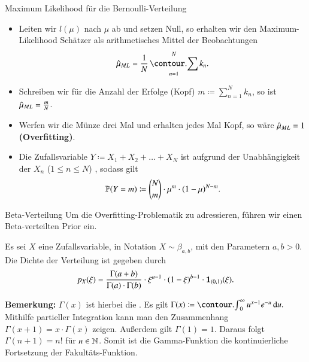 \begin{frame}{Maximum Likelihood für die Bernoulli-Verteilung}{}
	\begin{itemize}
		\item Leiten wir $l(\mu)$ nach $\mu$ ab und setzen Null, so erhalten wir den Maximum-Likelihood Schätzer als
			arithmetisches Mittel der Beobachtungen
		\begin{equation*}
			\muML = \frac{1}{N} \sum_{n=1}^N k_n.
		\end{equation*}
		\item Schreiben wir für die Anzahl der Erfolge (Kopf) $m \coloneqq \sum_{n=1}^N k_n$, so ist $\hat{\mu}_{ML} = \frac{m}{N}$.
		\item Werfen wir die Münze drei Mal und erhalten jedes Mal Kopf, so wäre $\hat{\mu}_{ML} = 1$ \textbf{(Overfitting)}.
		\item Die Zufallsvariable $Y \coloneqq X_1 + X_2 + \ldots + X_N$ ist aufgrund der Unabhängigkeit der $X_n$
			($1 \le n \le N$) , sodass gilt
		\begin{equation*}
			\mathbb{P}(Y = m) \coloneqq {N \choose m} \cdot \mu^m \cdot (1 - \mu)^{N - m}.
		\end{equation*}
	\end{itemize}
\end{frame}


\begin{frame}{Beta-Verteilung}{}
	Um die Overfitting-Problematik zu adressieren, führen wir einen Beta-verteilten Prior ein.
	
	\begin{mydef}
		Es sei $X$ eine  Zufallsvariable, in Notation $X \sim \beta_{a, b}$, mit den Parametern
		$a, b > 0$. Die Dichte der Verteilung ist gegeben durch
		\begin{equation*}
			p_X(\xi)
				= \frac{\Gamma(a + b)}{\Gamma(a) \cdot \Gamma(b)}
					\cdot \xi^{a - 1} \cdot (1 - \xi)^{b - 1} \cdot \bm{1}_{(0, 1)}(\xi).
		\end{equation*}
	\end{mydef}
	
	\begin{boxGray}
		\textbf{Bemerkung:} $\Gamma(x)$ ist hierbei die . Es gilt
		$\Gamma(x) \coloneqq \int_0^\infty u^{x-1} e^{-u}\,\diff u.$ Mithilfe partieller Integration kann man den Zusammenhang
		$\Gamma(x + 1) = x \cdot \Gamma(x)$ zeigen. Außerdem gilt $\Gamma(1) = 1$. Daraus folgt $\Gamma(n + 1) = n!$ für
		$n \in \mathbb{N}$. Somit ist die Gamma-Funktion die kontinuierliche Fortsetzung der Fakultäts-Funktion.
	\end{boxGray}
\end{frame}


